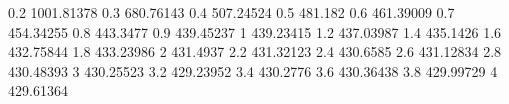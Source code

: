 0.2	1001.81378
0.3	680.76143
0.4	507.24524
0.5	481.182
0.6	461.39009
0.7	454.34255
0.8	443.3477
0.9	439.45237
1	439.23415
1.2	437.03987
1.4	435.1426
1.6	432.75844
1.8	433.23986
2	431.4937
2.2	431.32123
2.4	430.6585
2.6	431.12834
2.8	430.48393
3	430.25523
3.2	429.23952
3.4	430.2776
3.6	430.36438
3.8	429.99729
4	429.61364
